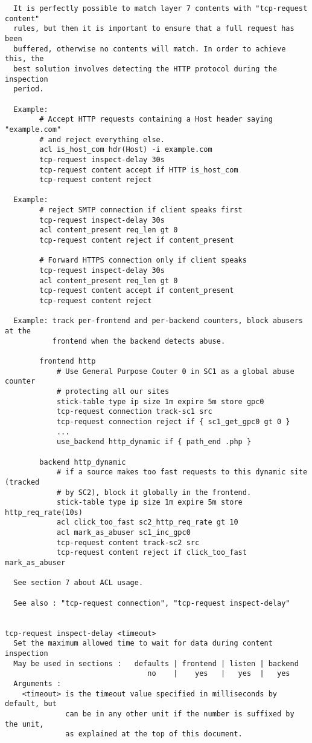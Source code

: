 \begin{verbatim}
  It is perfectly possible to match layer 7 contents with "tcp-request content"
  rules, but then it is important to ensure that a full request has been
  buffered, otherwise no contents will match. In order to achieve this, the
  best solution involves detecting the HTTP protocol during the inspection
  period.

  Example:
        # Accept HTTP requests containing a Host header saying "example.com"
        # and reject everything else.
        acl is_host_com hdr(Host) -i example.com
        tcp-request inspect-delay 30s
        tcp-request content accept if HTTP is_host_com
        tcp-request content reject

  Example:
        # reject SMTP connection if client speaks first
        tcp-request inspect-delay 30s
        acl content_present req_len gt 0
        tcp-request content reject if content_present

        # Forward HTTPS connection only if client speaks
        tcp-request inspect-delay 30s
        acl content_present req_len gt 0
        tcp-request content accept if content_present
        tcp-request content reject

  Example: track per-frontend and per-backend counters, block abusers at the
           frontend when the backend detects abuse.

        frontend http
            # Use General Purpose Couter 0 in SC1 as a global abuse counter
            # protecting all our sites
            stick-table type ip size 1m expire 5m store gpc0
            tcp-request connection track-sc1 src
            tcp-request connection reject if { sc1_get_gpc0 gt 0 }
            ...
            use_backend http_dynamic if { path_end .php }

        backend http_dynamic
            # if a source makes too fast requests to this dynamic site (tracked
            # by SC2), block it globally in the frontend.
            stick-table type ip size 1m expire 5m store http_req_rate(10s)
            acl click_too_fast sc2_http_req_rate gt 10
            acl mark_as_abuser sc1_inc_gpc0
            tcp-request content track-sc2 src
            tcp-request content reject if click_too_fast mark_as_abuser

  See section 7 about ACL usage.

  See also : "tcp-request connection", "tcp-request inspect-delay"


tcp-request inspect-delay <timeout>
  Set the maximum allowed time to wait for data during content inspection
  May be used in sections :   defaults | frontend | listen | backend
                                 no    |    yes   |   yes  |   yes
  Arguments :
    <timeout> is the timeout value specified in milliseconds by default, but
              can be in any other unit if the number is suffixed by the unit,
              as explained at the top of this document.


\end{verbatim}
